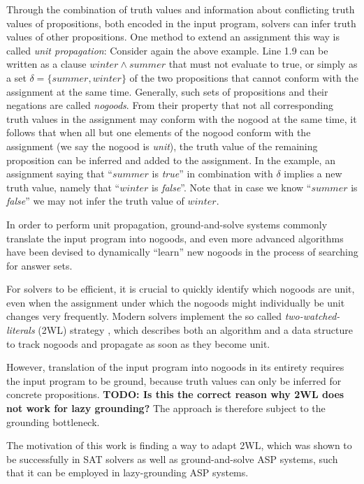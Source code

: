 \documentclass{vutinfth} %
\newcommand{\todo}[1]{{\color{red}\textbf{TODO: {#1}}}} %
\begin{document}
Through the combination of truth values and information about conflicting truth values of propositions, both encoded in the input program, solvers can infer truth values of other propositions. One method to extend an assignment this way is called \emph{unit propagation}: Consider again the above example. Line 1.9 can be written as a clause $winter \wedge summer$ that must not evaluate to true, or simply as a set $\delta = \{ summer, winter \}$ of the two propositions that cannot conform with the assignment at the same time. Generally, such sets of propositions and their negations are called \emph{nogoods}. From their property that not all corresponding truth values in the assignment may conform with the nogood at the same time, it follows that when all but one elements of the nogood conform with the assignment (we say the nogood is \emph{unit}), the truth value of the remaining proposition can be inferred and added to the assignment. In the example, an assignment saying that \enquote{$summer$ is \emph{true}} in combination with $\delta$ implies a new truth value, namely that \enquote{$winter$ is \emph{false}}. Note that in case we know \enquote{$summer$ is \emph{false}} we may not infer the truth value of $winter$.

In order to perform unit propagation, ground-and-solve systems commonly translate the input program into nogoods, and even more advanced algorithms have been devised to dynamically \enquote{learn} new nogoods in the process of searching for answer sets.

For solvers to be efficient, it is crucial to quickly identify which nogoods are unit, even when the assignment under which the nogoods might individually be unit changes very frequently. Modern solvers implement the so called \emph{two-watched-literals} (2WL) strategy \cite{effsat,questsat}, which describes both an algorithm and a data structure to track nogoods and propagate as soon as they become unit.

However, translation of the input program into nogoods in its entirety requires the input program to be ground, because truth values can only be inferred for concrete propositions. \todo{Is this the correct reason why 2WL does not work for lazy grounding?} The approach is therefore subject to the grounding bottleneck.

The motivation of this work is finding a way to adapt 2WL, which was shown to be successfully in SAT solvers as well as ground-and-solve ASP systems, such that it can be employed in lazy-grounding ASP systems.
\end{document}
